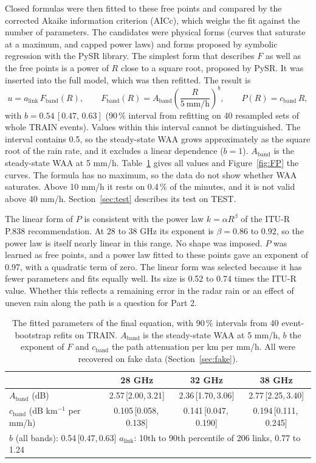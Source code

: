 \documentclass[11pt,a4paper]{article}
\newcommand{\alink}{a_{\mathrm{link}}}
\newcommand{\Aband}{A_{\mathrm{band}}}
\newcommand{\cband}{c_{\mathrm{band}}}
\newcommand{\Fband}{F_{\mathrm{band}}}
\newcommand{\iv}[2]{\,[#1,\,#2]}
\begin{document}
Closed formulas were then fitted to these free points and compared by the corrected Akaike information criterion (AICc), which
weighs the fit against the number of parameters. The candidates were physical forms (curves that saturate at a maximum, and
capped power laws) and forms proposed by symbolic regression with the PySR library. The simplest form that describes $F$ as well
as the free points is a power of $R$ close to a square root, proposed by PySR. It was inserted into the full model, which was
then refitted. The result is
\begin{equation}
u = \alink\,\Fband(R), \qquad \Fband(R) = \Aband\left(\frac{R}{5\ \mathrm{mm/h}}\right)^{b}, \qquad P(R) = \cband\,R,
\label{eq:final}
\end{equation}
with $b = 0.54\iv{0.47}{0.63}$ (90\,\% interval from refitting on 40 resampled sets of whole TRAIN events). Values within this
interval cannot be distinguished. The interval contains 0.5, so the steady-state WAA grows approximately as the square root of
the rain rate, and it excludes a linear dependence ($b = 1$). $\Aband$ is the steady-state WAA at 5 mm/h. Table~\ref{tab:numbers}
gives all values and Figure~\ref{fig:FP} the curves. The formula has no maximum, so the data do not show whether WAA saturates.
Above 10 mm/h it rests on 0.4\,\% of the minutes, and it is not valid above 40 mm/h. Section~\ref{sec:test} describes its test
on TEST.

The linear form of $P$ is consistent with the power law $k = \alpha R^{\beta}$ of the ITU-R P.838 recommendation. At 28 to
38 GHz its exponent is $\beta = 0.86$ to 0.92, so the power law is itself nearly linear in this range. No shape was imposed. $P$
was learned as free points, and a power law fitted to these points gave an exponent of 0.97, with a quadratic term of zero. The
linear form was selected because it has fewer parameters and fits equally well. Its size is 0.52 to 0.74 times the ITU-R value.
Whether this reflects a remaining error in the radar rain or an effect of uneven rain along the path is a question for Part 2.

\begin{table}[H]
\centering\small
\caption{The fitted parameters of the final equation, with 90\,\% intervals from 40 event-bootstrap refits on TRAIN. $\Aband$
is the steady-state WAA at 5 mm/h, $b$ the exponent of $F$ and $\cband$ the path attenuation per km per mm/h. All were
recovered on fake data (Section~\ref{sec:fake}).}
\label{tab:numbers}
\begin{tabular}{lccc}
\toprule
 & 28 GHz & 32 GHz & 38 GHz\\
\midrule
$\Aband$ (dB) & 2.57\iv{2.00}{3.21} & 2.36\iv{1.70}{3.06} & 2.77\iv{2.25}{3.40}\\
$\cband$ (dB km$^{-1}$ per mm/h) & 0.105\iv{0.058}{0.138} & 0.141\iv{0.047}{0.190} & 0.194\iv{0.111}{0.245}\\
\midrule
\multicolumn{4}{l}{$b$ (all bands): 0.54\iv{0.47}{0.63} \qquad $\alink$: 10th to 90th percentile of 206 links, 0.77 to 1.24}\\
\bottomrule
\end{tabular}
\end{table}
\end{document}
